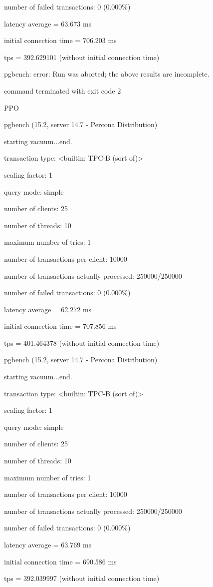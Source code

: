 number of failed transactions: 0 (0.000\%)

latency average = 63.673 ms

initial connection time = 706.203 ms

tps = 392.629101 (without initial connection time)

pgbench: error: Run was aborted; the above results are incomplete.

command terminated with exit code 2

PPO

pgbench (15.2, server 14.7 - Percona Distribution)

starting vacuum...end.

transaction type: <builtin: TPC-B (sort of)>

scaling factor: 1

query mode: simple

number of clients: 25

number of threads: 10

maximum number of tries: 1

number of transactions per client: 10000

number of transactions actually processed: 250000/250000

number of failed transactions: 0 (0.000\%)

latency average = 62.272 ms

initial connection time = 707.856 ms

tps = 401.464378 (without initial connection time)

pgbench (15.2, server 14.7 - Percona Distribution)

starting vacuum...end.

transaction type: <builtin: TPC-B (sort of)>

scaling factor: 1

query mode: simple

number of clients: 25

number of threads: 10

maximum number of tries: 1

number of transactions per client: 10000

number of transactions actually processed: 250000/250000

number of failed transactions: 0 (0.000\%)

latency average = 63.769 ms

initial connection time = 690.586 ms

tps = 392.039997 (without initial connection time)

